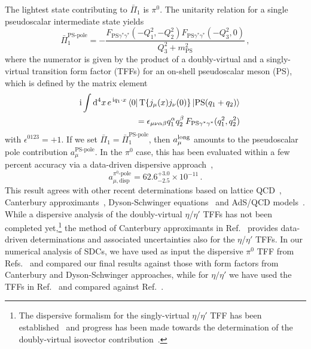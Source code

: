 The lightest state contributing to $\bar{\Pi}_1$ is $\pi^0$. The unitarity relation for a single pseudoscalar intermediate state yields
\begin{equation}
\bar{\Pi}_1^\text{PS-pole} = -\frac{F_{\text{PS} \gamma^* \gamma^*}(-Q_1^2, -Q_2^2) F_{\text{PS} \gamma^* \gamma^*}(-Q_3^2, 0)}{Q_3^2 + m_\text{PS}^2}\, ,
\label{Eq:Pi1PSpole}
\end{equation}
where the numerator is given by the product of a doubly-virtual and a singly-virtual transition form factor (TFFs) for an on-shell pseudoscalar meson (PS), which is defined by the matrix element
\begin{eqnarray}
&&\text{i} \int \mathop{}\!\mathrm{d}^4 x\, e^{\,\text{i} q_1\cdot x} \bra{0} \operatorname{T}\{j_\mu(x) j_\nu(0)\}\ket{\text{PS}(q_1+q_2)} \nonumber\\
&&\quad= \epsilon_{\mu\nu\alpha\beta} q_1^\alpha q_2^\beta \,F_{\text{PS}\gamma^*\gamma^*}(q_1^2,q_2^2)
\label{Eq:TFF}
\end{eqnarray}
with $\epsilon^{0 1 2 3}=+1$. If we set $\bar{\Pi}_1 = \bar{\Pi}_1^\text{PS-pole}$, then $a_\mu^\text{long}$ amounts to the pseudoscalar pole contribution $a_\mu^{\text{PS-pole}}$. In the $\pi^0$ case, this has been evaluated within a few percent accuracy via a data-driven dispersive approach~\cite{Hoferichter:2014vra,PionTFFshort,PionTFF},
\begin{equation}
a_{\mu,\text{disp}}^{\pi^0\text{-pole}} = 62.6^{+3.0}_{-2.5}\times 10^{-11}\, .
\label{Eq:aPionPole}
\end{equation}
This result agrees with other recent determinations based on lattice QCD~\cite{Gerardin:2019vio}, Canterbury approximants~\cite{Canterbury}, Dyson-Schwinger equations~\cite{DSE,Raya:2019dnh} and AdS/QCD models~\cite{Leutgeb:2019zpq}. While a dispersive analysis of the doubly-virtual $\eta$/$\eta'$ TFFs has not been completed yet,\footnote{The dispersive formalism for the singly-virtual $\eta$/$\eta'$ TFF has been established~\cite{Hanhart:2013vba} and progress has been made towards the determination of the doubly-virtual isovector contribution~\cite{Xiao:2015uva,Kubis:2018bej}.} the method of Canterbury approximants in Ref.~\cite{Canterbury} provides data-driven determinations 
and associated uncertainties also for the $\eta$/$\eta '$ TFFs.  In our numerical analysis of SDCs, we have used as input the dispersive $\pi^0$ TFF from Refs.~\cite{PionTFFshort,PionTFF} and compared our final results against those with form factors from Canterbury and Dyson-Schwinger approaches, while for $\eta/\eta'$ we have used the TFFs in Ref.~\cite{Canterbury} and compared against Ref.~\cite{DSE}.

